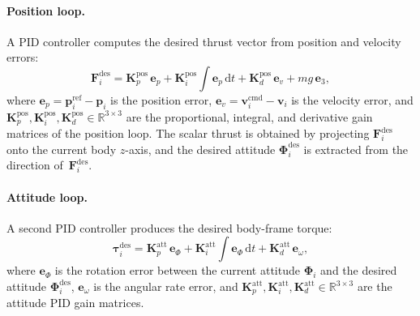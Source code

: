 \paragraph{Position loop.}
A PID controller computes the desired thrust vector from position and velocity
errors:
\begin{equation}
  \mathbf{F}_i^{\mathrm{des}} =
    \mathbf{K}_p^{\mathrm{pos}}\,\mathbf{e}_{p}
    + \mathbf{K}_i^{\mathrm{pos}}\!\int\!\mathbf{e}_{p}\,\mathrm{d}t
    + \mathbf{K}_d^{\mathrm{pos}}\,\mathbf{e}_{v}
    + mg\,\mathbf{e}_3,
  \label{eq:pid_pos}
\end{equation}
where $\mathbf{e}_{p} = \mathbf{p}_i^{\mathrm{ref}} - \mathbf{p}_i$ is the
position error, $\mathbf{e}_{v} = \mathbf{v}_i^{\mathrm{cmd}} - \mathbf{v}_i$
is the velocity error, and
$\mathbf{K}_p^{\mathrm{pos}}, \mathbf{K}_i^{\mathrm{pos}},
\mathbf{K}_d^{\mathrm{pos}} \in \mathbb{R}^{3 \times 3}$ are the
proportional, integral, and derivative gain matrices of the position loop.
The scalar thrust is obtained by projecting $\mathbf{F}_i^{\mathrm{des}}$ onto
the current body $z$-axis, and the desired attitude
$\boldsymbol{\Phi}_i^{\mathrm{des}}$ is extracted from the direction
of~$\mathbf{F}_i^{\mathrm{des}}$.

\paragraph{Attitude loop.}
A second PID controller produces the desired body-frame torque:
\begin{equation}
  \boldsymbol{\tau}_i^{\mathrm{des}} =
    \mathbf{K}_p^{\mathrm{att}}\,\mathbf{e}_{\Phi}
    + \mathbf{K}_i^{\mathrm{att}}\!\int\!\mathbf{e}_{\Phi}\,\mathrm{d}t
    + \mathbf{K}_d^{\mathrm{att}}\,\mathbf{e}_{\omega},
  \label{eq:pid_att}
\end{equation}
where $\mathbf{e}_{\Phi}$ is the rotation error between the current attitude
$\boldsymbol{\Phi}_i$ and the desired attitude
$\boldsymbol{\Phi}_i^{\mathrm{des}}$,
$\mathbf{e}_{\omega}$ is the angular rate error, and
$\mathbf{K}_p^{\mathrm{att}}, \mathbf{K}_i^{\mathrm{att}},
\mathbf{K}_d^{\mathrm{att}} \in \mathbb{R}^{3 \times 3}$ are the attitude PID
gain matrices.

